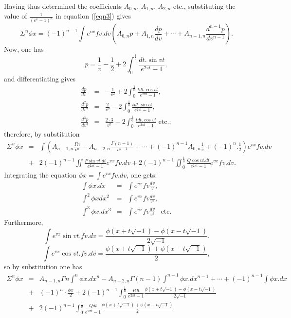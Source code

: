 \documentclass[12pt]{article}
\begin{document}
Having thus determined the coefficients $A_{0,n}$, $A_{1,n}$, $A_{2,n}$ etc., substituting the value of $\frac{1}{\left(e^v-1\right)^n}$ in equation (\ref{eqn3}) gives 
\[ \Sigma^n \phi x = (-1)^{n-1} \int e^{vx} fv.dv \left(A_{0,n} p + A_{1,n} \frac{dp}{dv} + \cdots + A_{n-1,n} \frac{d^{n-1} p}{dv^{n-1}}\right). \]
Now, one has
\[ p = \frac{1}{v} - \frac{1}{2} + 2 \int_0^{\frac{1}{0}} \frac{dt . \sin vt}{e^{2\pi t} - 1} , \]
and differentiating gives
\begin{eqnarray*} \frac{dp}{dv} & = & - \frac{1}{v^2} + 2 \int_0^{\frac{1}{0}} \frac{t dt. \cos vt}{e^{2\pi t} - 1} , \\
\frac{d^2p}{dv^2} & = & \frac{2}{v^2} - 2 \int_0^{\frac{1}{0}} \frac{t dt. \sin vt}{e^{2\pi t} - 1} , \\
\frac{d^3p}{dv^3} & = & \frac{2 \cdot 3}{v^2} - 2 \int_0^{\frac{1}{0}} \frac{t dt. \cos vt}{e^{2\pi t} - 1} \; \mathrm{etc.;} \end{eqnarray*} 
therefore, by substitution
\[ \begin{array}{rcl} \Sigma^n \phi x &=& \displaystyle \int \left( A_{n-1,n} \frac{\Gamma n}{v^n} - A_{n-2,n} \frac{\Gamma(n-1)}{v^{n-1}} + \cdots + (-1)^{n-1} A_{0,n} \frac{1}{v} + (-1)^n . \frac{1}{2}\right) e^{vx} fv.dv \\
& + & 2 (-1)^{n-1} \displaystyle \iint \frac{P \sin vt.dt}{e^{2\pi t}-1} e^{vx} fv.dv + 2 (-1)^{n-1} \iint_0^{\frac{1}{0}} \frac{Q \cos vt . dt}{e^{2\pi t} - 1} e^{vx} fv.dv.\end{array} \]
Integrating the equation $\phi x = \int e^{vx}fv.dv$, one gets:
\begin{eqnarray*} \int \phi x. dx &=& \int e^{vx} fv \frac{dv}{v} ,\\
\int^2 \phi x dx^2 &=& \int e^{vx} fv \frac{dv}{v^2} ,\\
\int^3 \phi x . dx^3 &=& \int e^{vx} fv \frac{dv}{v^3} \;  \; \; \mathrm{etc. } \end{eqnarray*}
Furthermore,
\[ \int e^{vx} \sin vt . fv. dv = \frac{\phi(x+t \sqrt{-1}) - \phi(x - t \sqrt{-1})}{2\sqrt{-1}}. \]
\[ \int e^{vx} \cos vt . fv. dv = \frac{\phi(x+t \sqrt{-1}) + \phi(x - t \sqrt{-1})}{2}, \]
 so by substitution one has
  \begin{eqnarray*} \Sigma^n \phi x &=& A_{n-1,n} \Gamma n \int^n \phi x.dx^n - A_{n-2,n} \Gamma(n-1) \int^{n-1} \phi x.dx^{n-1} + \cdots + (-1)^{n-1} \int \phi x. dx \\
  &+& (-1)^n\cdot \frac{\phi x}{2} +  2 (-1)^{n-1} \int_0^{\frac{1}{0}} \frac{Pdt}{e^{2\pi t} - 1} \frac{\phi(x+t \sqrt{-1}) - \phi(x - t \sqrt{-1})}{2\sqrt{-1}} \\
 &+& 2 (-1)^{n-1} \int_0^{\frac{1}{0}} \frac{Qdt}{e^{2\pi t}-1} \frac{\phi(x+t \sqrt{-1}) + \phi(x - t \sqrt{-1})}{2} \end{eqnarray*}
\end{document}
